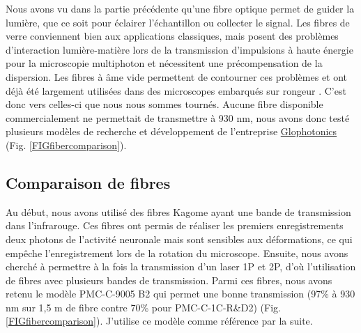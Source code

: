 Nous avons vu dans la partie précédente qu'une fibre optique permet de guider la lumière, que ce soit pour éclairer l'échantillon ou collecter le signal. Les fibres de verre conviennent bien aux applications classiques, mais posent des problèmes d'interaction lumière-matière lors de la transmission d'impulsions à haute énergie pour la microscopie multiphoton et nécessitent une précompensation de la dispersion. Les fibres à âme vide permettent de contourner ces problèmes et ont déjà été largement utilisées dans des microscopes embarqués sur rongeur \cite{tai_two-photon_2004} \cite{flusberg_vivo_2005} \cite{engelbrecht_ultra-compact_2008} \cite{piyawattanametha_vivo_2009} \cite{choi_improving_2014} \cite{klioutchnikov_three-photon_2020}. C'est donc vers celles-ci que nous nous sommes tournés. Aucune fibre disponible commercialement ne permettait de transmettre à 930 nm, nous avons donc testé plusieurs modèles de recherche et développement de l'entreprise \href{http://www.glophotonics.fr/}{Glophotonics} (Fig. \ref{FIGfibercomparison}).


\subsection{Comparaison de fibres}



Au début, nous avons utilisé des fibres Kagome ayant une bande de transmission dans l'infrarouge. Ces fibres ont permis de réaliser les premiers enregistrements deux photons de l'activité neuronale mais sont sensibles aux déformations, ce qui empêche l'enregistrement lors de la rotation du microscope. Ensuite, nous avons cherché à permettre à la fois la transmission d'un laser 1P et 2P, d'où l'utilisation de fibres avec plusieurs bandes de transmission. Parmi ces fibres, nous avons retenu le modèle PMC-C-9005 B2 qui permet une bonne transmission (97\% à 930 nm sur 1,5 m de fibre contre 70\% pour PMC-C-1C-R\&D2) (Fig. \ref{FIGfibercomparison}). J'utilise ce modèle comme référence par la suite.

